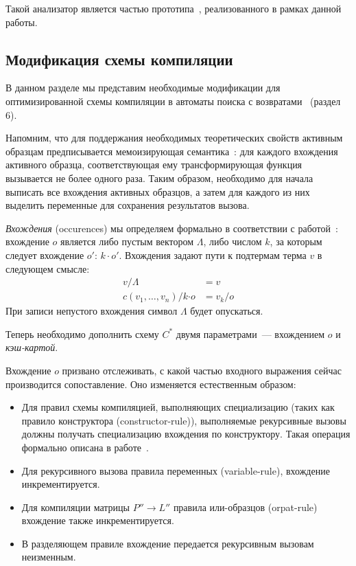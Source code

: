 
Такой анализатор является частью прототипа~\cite{myrepo}, реализованного в рамках данной работы.

\subsection{Модификация схемы компиляции}

В данном разделе мы представим необходимые модификации для оптимизированной схемы компиляции в автоматы поиска с возвратами~\cite{fessant2001optimizing} (раздел 6).

Напомним, что для поддержания необходимых теоретических свойств активным образцам предписывается мемоизирующая семантика~\cite{okasaki98views}: для каждого вхождения активного образца, соответствующая ему трансформирующая функция вызывается не более одного раза. Таким образом, необходимо для начала выписать все вхождения активных образцов, а затем для каждого из них выделить переменные для сохранения результатов вызова.

\textit{Вхождения} (occurences) мы определяем формально в соответствии с работой~\cite{maranget2008decisiontrees}: вхождение $o$ является либо пустым вектором $\Lambda$, либо числом $k$, за которым следует вхождение $o'$: $k \cdot o'$. Вхождения задают пути к подтермам терма $v$ в следующем смысле:
\begin{align*}
	v/\Lambda &= v  \\
	c(v_1,\ldots, v_n)/k \boldsymbol{\cdot} o &= v_k/o  
\end{align*}
При записи  непустого вхождения символ $\Lambda$ будет опускаться.

Теперь необходимо дополнить схему $C^*$ двумя параметрами~--- вхождением $o$  и \textit{кэш-картой}.

Вхождение $o$ призвано отслеживать, с какой частью входного выражения сейчас производится сопоставление. Оно изменяется естественным образом:

\begin{itemize}
\item Для правил схемы компиляцией, выполняющих специализацию (таких как правило конструктора (constructor-rule)), выполняемые рекурсивные вызовы должны получать специализацию вхождения по конструктору. Такая операция формально описана в работе~\cite{maranget2008decisiontrees}.
\item Для рекурсивного вызова правила переменных (variable-rule), вхождение инкрементируется.
\item Для компиляции матрицы $P'' \to L''$ правила или-образцов (orpat-rule)~\cite{fessant2001optimizing} вхождение также инкрементируется.
\item В разделяющем правиле вхождение передается рекурсивным вызовам неизменным.
\end{itemize}

